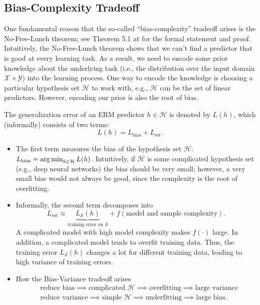 \subsection{Bias-Complexity Tradeoff}
One fundamental reason that the so-called ``bias-complexity'' tradeoff arises is the No-Free-Lunch theorem; see Theorem 5.1 at \cite{shalev2014understanding} for the formal statement and proof.
Intuitively, the No-Free-Lunch theorem shows that we can't find a predictor that is good at every learning task. 
As a result, we need to encode some prior knowledge about the underlying task (i.e., the distribution over the input domain $\mathcal{X} \times \mathcal{Y}$) into the learning process.
One way to encode the knowledge is choosing a particular hypothesis set $\mathcal{H}$ to work with, e.g., $\mathcal{H}$ can be the set of linear predictors.
However, encoding our prior is also the root of bias.

The generalization error of an ERM predictor $h \in \mathcal{H}$ is denoted by $L(h)$, which (informally) consists of two terms:
    \begin{equation}
        L(h) = L_\text{bias} + L_\text{est}.
    \end{equation}
\begin{itemize}
    \item The first term measures the bias of the hypothesis set $\mathcal{H}$: $L_\text{bias} = \operatorname{arg\,min}_{h \in \mathcal{H}} L(h)$.
          Intuitively, if $\mathcal{H}$ is some complicated hypothesis set (e.g., deep neural networks) the bias should be very small; however, a very small bias would not always be good, since the complexity is the root of overfitting.
          
    \item Informally, the second term decomposes into
        \begin{equation}
            L_\text{est} \approx \underbrace{L_{\mathcal{S}}(h)}_{\text{training error on $\mathcal{S}$}} + f(\text{model and sample complexity}).
        \end{equation}
    A complicated model with high model complexity makes $f(\cdot)$ large.
    In addition, a complicated model tends to overfit training data.
    Thus, the training error $L_\mathcal{S}(h)$  changes a lot for different training data, leading to high variance of training errors. 
    
    \item How the Bias-Variance tradeoff arises
        \begin{equation}
            \begin{aligned}
                    & \text{reduce bias} \implies \text{complicated $\mathcal{H}$} \implies \text{overfitting} \implies \text{large variance} \\
                    & \text{reduce variance} \implies \text{simple $\mathcal{H}$}   \implies \text{underfitting} \implies \text{large bias}.
            \end{aligned}
        \end{equation}
\end{itemize}

